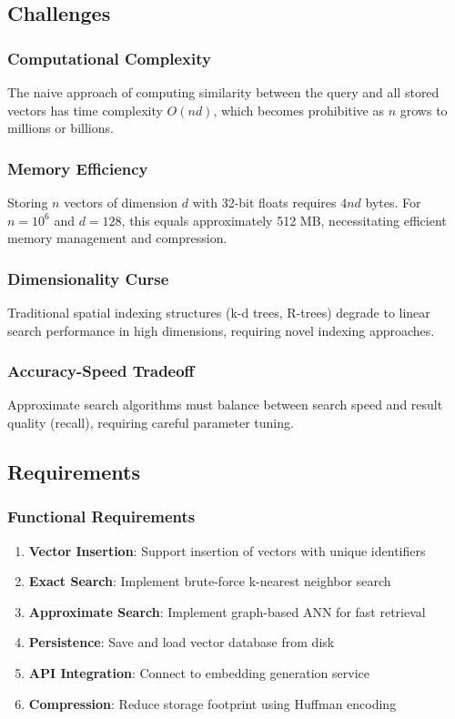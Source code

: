\documentclass[12pt,a4paper]{article}
\begin{document}
\subsection{Challenges}

\subsubsection{Computational Complexity}
The naive approach of computing similarity between the query and all stored vectors has time complexity $O(nd)$, which becomes prohibitive as $n$ grows to millions or billions.

\subsubsection{Memory Efficiency}
Storing $n$ vectors of dimension $d$ with 32-bit floats requires $4nd$ bytes. For $n = 10^6$ and $d = 128$, this equals approximately 512 MB, necessitating efficient memory management and compression.

\subsubsection{Dimensionality Curse}
Traditional spatial indexing structures (k-d trees, R-trees) degrade to linear search performance in high dimensions, requiring novel indexing approaches.

\subsubsection{Accuracy-Speed Tradeoff}
Approximate search algorithms must balance between search speed and result quality (recall), requiring careful parameter tuning.

\subsection{Requirements}

\subsubsection{Functional Requirements}
\begin{enumerate}
    \item \textbf{Vector Insertion}: Support insertion of vectors with unique identifiers
    \item \textbf{Exact Search}: Implement brute-force k-nearest neighbor search
    \item \textbf{Approximate Search}: Implement graph-based ANN for fast retrieval
    \item \textbf{Persistence}: Save and load vector database from disk
    \item \textbf{API Integration}: Connect to embedding generation service
    \item \textbf{Compression}: Reduce storage footprint using Huffman encoding
\end{enumerate}
\end{document}
